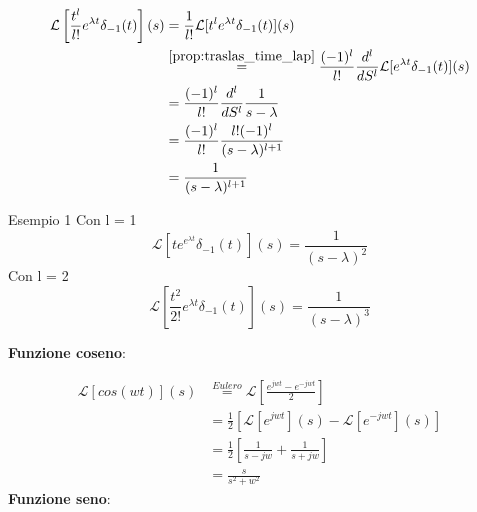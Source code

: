 \documentclass[a4paper]{article}
\begin{document}
\begin{align*}
    \mathcal{L}\left[\frac{t^l}{l!}e^{\lambda t}\delta_{-1}(t)\right](s) &= \frac{1}{l!}\mathcal{L}[t^l e^{\lambda t}\delta_{-1}(t)](s)\\
    &\stackrel{\ref{prop:traslas_time_lap}}{=} \frac{(-1)^l}{l!}\frac{d^l}{dS^l}\mathcal{L}[e^{\lambda t}\delta_{-1}(t)](s)\\
    &= \frac{(-1)^l}{l!}\frac{d^l}{dS^l}\frac{1}{s-\lambda}\\
    &= \frac{(-1)^l}{l!}\frac{l! (-1)^l}{(s-\lambda)^{l+1}}\\
    &= \frac{1}{(s-\lambda)^{l+1}}
\end{align*}
\begin{examplebox}{Esempio 1}
    Con l = 1 
    \[\mathcal{L}[te^{e^{\lambda t}}\delta_{-1}(t)](s) = \frac{1}{(s-\lambda)^2}\]
    Con l = 2
    \[\mathcal{L}\left[\frac{t^2}{2!}e^{\lambda t}\delta_{-1}(t)\right](s) = \frac{1}{(s-\lambda)^3}\]
\end{examplebox}
\noindent
\textbf{Funzione coseno}:
\begin{figure}[H]
    \centering
\end{figure}
\begin{align*}
\mathcal{L}[cos(wt)](s) &\stackrel{Eulero}{=} \mathcal{L}\left[\frac{e^{jwt} - e^{-jwt}}{2}\right]\\
&= \frac{1}{2}\left[\mathcal{L}[e^{jwt}](s) - \mathcal{L}[e^{-jwt}](s)\right] \\
&= \frac{1}{2}\left[\frac{1}{s-jw} + \frac{1}{s+jw}\right] \\
&= \frac{s}{s^2 + w^2}
\end{align*}
\textbf{Funzione seno}:
\begin{figure}[H]
    \centering
\end{figure}
\end{document}
